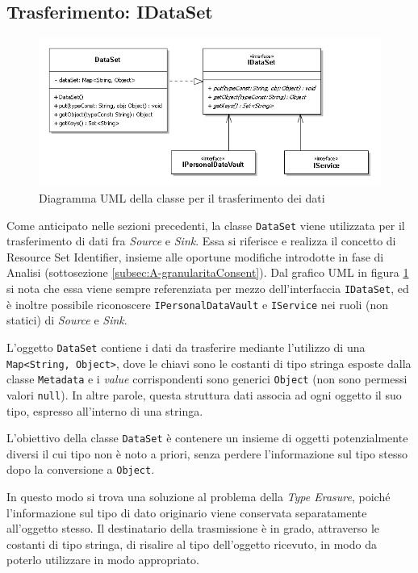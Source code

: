 \subsection{Trasferimento: IDataSet}
\begin{figure} [h]
	\includegraphics[width=\linewidth]{pictures/IDataSet.png}
	\caption{Diagramma UML della classe per il trasferimento dei dati}
	\label{fig:IDataSet}
\end{figure}
Come anticipato nelle sezioni precedenti, la classe \texttt{DataSet} viene utilizzata per il trasferimento di dati fra \textit{Source} e \textit{Sink}. Essa si riferisce e realizza il concetto di Resource Set Identifier, insieme alle oportune modifiche introdotte in fase di Analisi (sottosezione \ref{subsec:A-granularitaConsent}).
 Dal grafico UML in figura \ref{fig:IDataSet} si nota che essa viene sempre referenziata per mezzo dell’interfaccia \texttt{IDataSet}, ed è inoltre possibile riconoscere \texttt{IPersonalDataVault} e \texttt{IService} nei ruoli (non statici) di \textit{Source} e \textit{Sink}.

L’oggetto \texttt{DataSet} contiene i dati da trasferire mediante l’utilizzo di una \texttt{Map<String, Object>}, dove le chiavi sono le costanti di tipo stringa esposte dalla classe \texttt{Metadata} e i \textit{value} corrispondenti sono generici \texttt{Object} (non sono permessi valori \texttt{null}). In altre parole, questa struttura dati associa ad ogni oggetto il suo tipo, espresso all’interno di una stringa.

L’obiettivo della classe \texttt{DataSet} è contenere un insieme di oggetti potenzialmente diversi il cui tipo non è noto a priori, senza perdere l’informazione sul tipo stesso dopo la conversione a \texttt{Object}.

In questo modo si trova una soluzione al problema della \textit{Type Erasure}, poiché l’informazione sul tipo di dato originario viene conservata separatamente all’oggetto stesso. Il destinatario della trasmissione è in grado, attraverso le costanti di tipo stringa, di risalire al tipo dell’oggetto ricevuto, in modo da poterlo utilizzare in modo appropriato.

